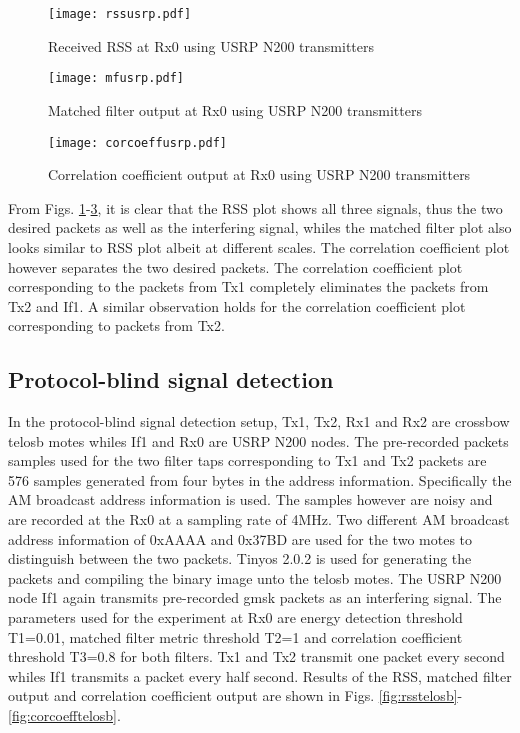 \documentclass[journal]{IEEEtran}
\begin{document}
\begin{figure}[htb]
\begin{center}
	\texttt{[image: rssusrp.pdf]} 
\caption{Received RSS at Rx0 using USRP N200 transmitters}
\label{fig:rssusrp}
\end{center}
\end{figure}

\begin{figure}[htb]
\begin{center}
	\texttt{[image: mfusrp.pdf]} 
\caption{Matched filter output at Rx0 using USRP N200 transmitters}
\label{fig:mfusrp}
\end{center}
\end{figure}

\begin{figure}[htb]
\begin{center}
	\texttt{[image: corcoeffusrp.pdf]} 
\caption{Correlation coefficient output at Rx0 using USRP N200 transmitters}
\label{fig:corcoeffusrp}
\end{center}
\end{figure}

From Figs. \ref{fig:rssusrp}-\ref{fig:corcoeffusrp}, it is clear that the RSS plot shows all three signals, thus the two desired packets as well as the interfering signal, whiles the matched filter plot also looks similar to RSS plot albeit at different scales. The correlation coefficient plot however separates the two desired packets. The correlation coefficient plot corresponding to the packets from Tx1 completely eliminates the packets from Tx2 and If1. A similar observation holds for the correlation coefficient plot corresponding to packets from Tx2.

\subsection{Protocol-blind signal detection} \label{sec:protblind}
In the protocol-blind signal detection setup, Tx1, Tx2, Rx1 and Rx2 are crossbow telosb motes whiles If1 and Rx0 are USRP N200 nodes. The pre-recorded packets samples used for the two filter taps corresponding to Tx1 and Tx2 packets are 576 samples generated from four bytes in the address information. Specifically the AM broadcast address information is used. The samples however are noisy and are recorded at the Rx0 at a sampling rate of 4MHz. Two different AM broadcast address information of 0xAAAA and 0x37BD are used for the two motes to distinguish between the two packets. Tinyos 2.0.2 is used for generating the packets and compiling the binary image unto the telosb motes. The USRP N200 node If1 again transmits pre-recorded gmsk packets as an interfering signal. The parameters used for the experiment at Rx0 are energy detection threshold T1=0.01, matched filter metric threshold T2=1 and correlation coefficient threshold T3=0.8 for both filters. Tx1 and Tx2 transmit one packet every second whiles If1 transmits a packet every half second. Results of the RSS, matched filter output and correlation coefficient output are shown in  Figs. \ref{fig:rsstelosb}-\ref{fig:corcoefftelosb}.
\end{document}
